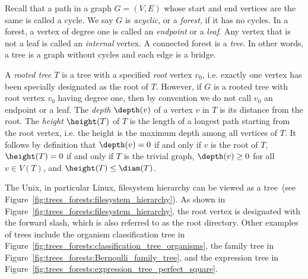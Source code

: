 Recall that a path in a graph $G = (V, E)$ whose start and
end vertices are the same is called a cycle. We say $G$ is
\emph{acyclic}, or a \emph{forest}, if it
has no cycles. In a forest, a vertex of degree one is called an
\emph{endpoint} or a \emph{leaf}. Any
vertex that is not a leaf is called an \emph{internal}
vertex. A connected forest is a
\emph{tree}. In other words, a tree is a graph
without cycles and each edge is a bridge.

A \emph{rooted tree} $T$ is a tree with
a specified \emph{root} vertex $v_0$, i.e. exactly
one vertex has been specially designated as the root of $T$. However,
if $G$ is a rooted tree with root vertex $v_0$
having degree one, then by convention we do not call $v_0$ an
endpoint or a leaf. The
\emph{depth}
$\depth(v)$ of a vertex $v$ in $T$ is its
distance from the
root. The \emph{height}
$\height(T)$ of $T$ is the
length of a longest path starting from
the root vertex, i.e. the height
is the maximum depth among all vertices of $T$. It
follows by definition that $\depth(v) = 0$ if and
only if $v$ is the root of $T$, $\height(T) = 0$ if
and only if $T$ is the trivial graph,
$\depth(v) \geq 0$ for all $v \in V(T)$, and
$\height(T) \leq \diam(T)$.

The Unix, in particular Linux,
filesystem hierarchy
can be viewed as a tree~(see
Figure~\ref{fig:trees_forests:filesystem_hierarchy}). As shown in
Figure~\ref{fig:trees_forests:filesystem_hierarchy}, the
root vertex is designated with the forward slash,
which is also referred to as the root
directory. Other examples of trees include the
organism classification tree in
Figure~\ref{fig:trees_forests:classification_tree_organisms}, the
family tree in
Figure~\ref{fig:trees_forests:Bernoulli_family_tree}, and the
expression tree in
Figure~\ref{fig:trees_forests:expression_tree_perfect_square}.

